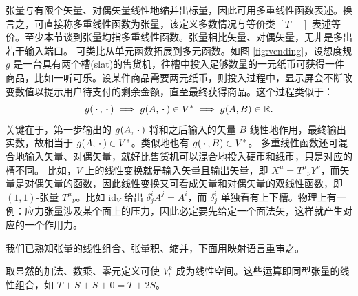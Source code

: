 张量与有限个矢量、对偶矢量线性地缩并出标量，因此可用多重线性函数表述。换言之，可直接称多重线性函数为张量，该定义多数情况与等价类 $[T^{\cdots}{}_{\cdots}]$ 表述等价。至少本节谈到张量均指多重线性函数。张量相比矢量、对偶矢量，无非是多出若干输入端口。
可类比从单元函数拓展到多元函数。如图 \ref{fig:vending}，设想度规 $g$ 是一台具有两个槽(slat)的售货机，往槽中投入足够数量的一元纸币可获得一件商品，比如一听可乐。设某件商品需要两元纸币，则投入过程中，显示屏会不断改变数值以提示用户待支付的剩余金额，直至最终获得商品。这个过程类似于：
\[
    g(\oo,\oo)\implies g(A,\oo)\in V^*\implies g(A,B)\in\R.  
\]
关键在于，第一步输出的 $g(A,\oo)$ 将和之后输入的矢量 $B$ 线性地作用，最终输出实数，故相当于 $g(A,\oo)\in V^*$。类似地也有 $g(\oo,B)\in V^*$。
多重线性函数还可混合地输入矢量、对偶矢量，就好比售货机可以混合地投入硬币和纸币，只是对应的槽不同。
比如，$V$ 上的线性变换就是输入矢量且输出矢量，即 $X^\mu=T^\mu{}_\nu Y^\nu$，而矢量是对偶矢量的函数，因此线性变换又可看成矢量和对偶矢量的双线性函数，即 $(1,1)$-张量 $T^\mu{}_\nu$。比如 $\mathrm{id}_V$ 给出 $\delta^i_j A^j=A^i$，而 $\delta^i_j$ 单独看有上下槽。物理上有一例：应力张量涉及某个面上的压力，因此必定要先给定一个面法矢，这样就产生对应的一个作用力。

我们已熟知张量的线性组合、张量积、缩并，下面用映射语言重审之。

\begin{definition}  
取显然的加法、数乘、零元定义可使 $V^k_l$ 成为线性空间。这些运算即同型张量的线性组合，如 $T+ S+S+0=T+2S$。
\end{definition}

